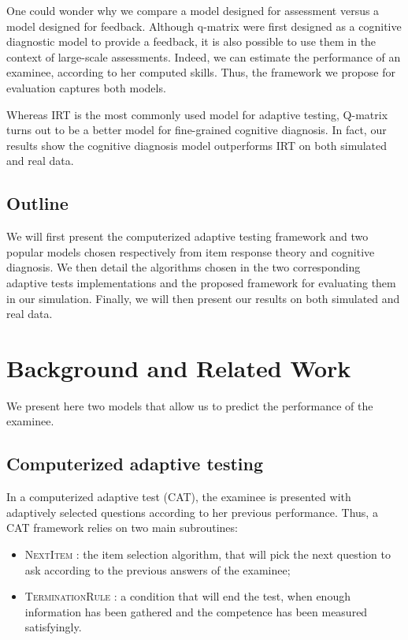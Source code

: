\documentclass{sig-alternate}
\begin{document}
One could wonder why we compare a model designed for assessment versus a model designed for feedback. Although q-matrix were first designed as a cognitive diagnostic model to provide a feedback, it is also possible to use them in the context of large-scale assessments. Indeed, we can estimate the performance of an examinee, according to her computed skills. Thus, the framework we propose for evaluation captures both models.

Whereas IRT is the most commonly used model for adaptive testing, Q-matrix turns out to be a better model for fine-grained cognitive diagnosis. In fact, our results show the cognitive diagnosis model outperforms IRT on both simulated and real data.

\subsection{Outline}

We will first present the computerized adaptive testing framework and two popular models chosen respectively from item response theory and cognitive diagnosis. We then detail the algorithms chosen in the two corresponding adaptive tests implementations and the proposed framework for evaluating them in our simulation. Finally, we will then present our results on both simulated and real data.

\section{Background and Related Work}

We present here two models that allow us to predict the performance of the examinee.

\subsection{Computerized adaptive testing}

In a computerized adaptive test (CAT), the examinee is presented with adaptively selected questions according to her previous performance. Thus, a CAT framework relies on two main subroutines:
\begin{itemize}
\item \textsc{NextItem} : the item selection algorithm, that will pick the next question to ask according to the previous answers of the examinee;
\item \textsc{TerminationRule} : a condition that will end the test, when enough information has been gathered and the competence has been measured satisfyingly.
\end{itemize}
\end{document}
